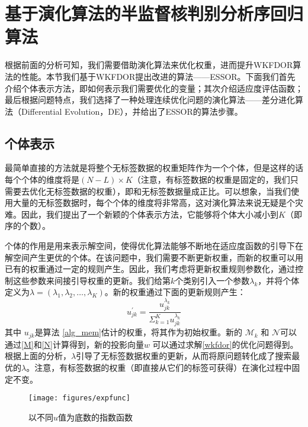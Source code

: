 \section{基于演化算法的半监督核判别分析序回归算法}
根据前面的分析可知，我们需要借助演化算法来优化权重，进而提升WKFDOR算法的性能。本节我们基于WKFDOR提出改进的算法——ESSOR。下面我们首先介绍个体表示方法，即如何表示我们需要优化的变量；其次介绍适应度评估函数；最后根据问题特点，我们选择了一种处理连续优化问题的演化算法——差分进化算法（Differential Evolution，DE），并给出了ESSOR的算法步骤。

\subsection{个体表示}
最简单直接的方法就是将整个无标签数据的权重矩阵作为一个个体，但是这样的话每个个体的维度将是\((N-L)\times K\)（注意，有标签数据的权重是固定的，我们只需要去优化无标签数据的权重），即和无标签数据量成正比。可以想象，当我们使用大量的无标签数据时，每个个体的维度将非常高，这对演化算法来说无疑是个灾难。因此，我们提出了一个新颖的个体表示方法，它能够将个体大小减小到\(K\)（即序的个数）。

个体的作用是用来表示解空间，使得优化算法能够不断地在适应度函数的引导下在解空间产生更优的个体。在该问题中，我们需要不断更新权重，而新的权重可以用已有的权重通过一定的规则产生。因此，我们考虑将更新权重规则参数化，通过控制这些参数来间接引导权重的更新。我们给第\(k\)个类别引入一个参数\(\lambda_{k}\)，并将个体定义为\(\lambda=(\lambda_{1},\lambda_{2},\dots,\lambda_{K})\)。新的权重通过下面的更新规则产生：
\begin{equation}
\label{mem_updateRule}
u_{jk}^{'}=\frac{u_{jk}^{\lambda_{k}}}{\Sigma_{k=1}^{K} u_{jk}^{\lambda_{k}}}
\end{equation}
其中 \(u_{jk}\)是算法 \ref{alg_mem}估计的权重，将其作为初始权重。新的 \(\mathcal{M}_{k}\) 和 \(\mathcal{N}\)可以通过\autoref{M}和\autoref{N}计算得到，新的投影向量\(w\) 可以通过求解\autoref{wkfdor}的优化问题得到。根据上面的分析，\(\lambda\)引导了无标签数据权重的更新，从而将原问题转化成了搜索最优的\(\lambda\)。注意，有标签数据的权重（即直接从它们的标签可获得）在演化过程中固定不变。

\begin{figure}[h]
   \centering
   \texttt{[image: figures/expfunc]}
\caption{以不同\(u\)值为底数的指数函数}
\label{fig_expFunc}
\end{figure}



